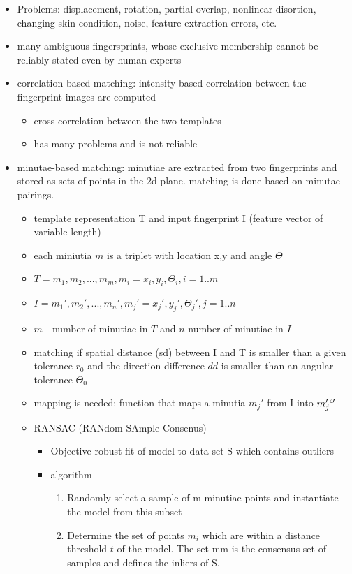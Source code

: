 \documentclass[paper=a4, fontsize=11pt]{scrartcl} %
\numberwithin{equation}{section} %
\numberwithin{figure}{section} %
\numberwithin{table}{section} %
\begin{document}
\begin{itemize}
\item Problems: displacement, rotation, partial overlap, nonlinear disortion, changing skin condition, noise, feature extraction errors, etc.
\item many ambiguous fingersprints, whose exclusive membership cannot be reliably stated even by human experts
\item correlation-based matching: intensity based correlation between the fingerprint images are computed
\begin{itemize}
\item cross-correlation between the two templates
\item has many problems and is not reliable
\end{itemize}
\item minutae-based matching: minutiae are extracted from two fingerprints and stored as sets of points in the 2d plane. matching is done based on minutae pairings.
\begin{itemize}
\item template representation T and input fingerprint I (feature vector of variable length)
\item each miniutia $m$ is a triplet with location x,y and angle $\Theta$
\item $T = {m_1,m_2,...,m_m}, m_i = {x_i,y_i,\Theta_i}, i = 1..m$
\item $I = {m_1',m_2',...,m_n'}, m_j' = {x_j',y_j',\Theta_j'}, j = 1..n$
\item $m$ - number of minutiae in $T$ and $n$ number of minutiae in $I$
\item matching if spatial distance (sd) between I and T is smaller than a given tolerance $r_0$ and the direction difference $dd$ is smaller than an angular tolerance $\Theta_0$
\item mapping is needed: function that maps a minutia $m_j'$ from I into $m_j'`'$
\item RANSAC (RANdom SAmple Consenus)
\begin{itemize}
\item Objective robust fit of model to data set S which contains outliers
\item algorithm
\begin{enumerate}
\item Randomly select a sample of m minutiae points and instantiate the model from this subset
\item Determine the set of points $m_i$ which are within a distance threshold $t$ of the model. The set mm is the consensus set of samples and defines the inliers of S.

\end{enumerate}
\end{itemize}
\end{itemize}
\end{itemize}
\end{document}
